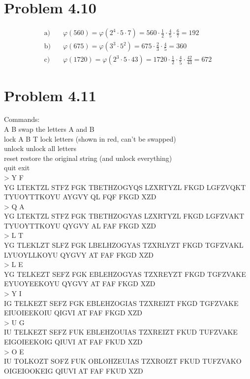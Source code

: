 \documentclass[12pt]{article}
\begin{document}
\section*{Problem 4.10}
    \begin{align*}
    \text{a)} & \quad \varphi(560) = \varphi(2^4 \cdot 5 \cdot 7) = 560 \cdot \frac{1}{2} \cdot \frac{4}{5} \cdot \frac{6}{7} = 192 \\
    \text{b)} & \quad \varphi(675) = \varphi(3^3 \cdot 5^2) = 675 \cdot \frac{2}{3} \cdot \frac{4}{5} = 360 \\
    \text{c)} & \quad \varphi(1720) = \varphi(2^3 \cdot 5 \cdot 43) = 1720 \cdot \frac{1}{2} \cdot \frac{4}{5} \cdot \frac{42}{43} = 672
\end{align*}
\section*{Problem 4.11}
Commands:\\
  A B        swap the letters A and B\\
  lock A B T lock letters (shown in red, can't be swapped)\\
  unlock     unlock all letters\\
  reset      restore the original string (and unlock everything)\\
  quit       exit\\
> Y F\\
YG LTEKTZL STFZ FGK TBETHZOGYQS LZXRTYZL FKGD LGFZVQKT TYUOYTTKOYU AYGVY QL FQF FKGD XZD\\
> Q A\\
YG LTEKTZL STFZ FGK TBETHZOGYAS LZXRTYZL FKGD LGFZVAKT TYUOYTTKOYU QYGVY AL FAF FKGD XZD\\
> L T\\
YG TLEKLZT SLFZ FGK LBELHZOGYAS TZXRLYZT FKGD TGFZVAKL LYUOYLLKOYU QYGVY AT FAF FKGD XZD\\
> L E\\
YG TELKEZT SEFZ FGK EBLEHZOGYAS TZXREYZT FKGD TGFZVAKE EYUOYEEKOYU QYGVY AT FAF FKGD XZD\\
> Y I\\
IG TELKEZT SEFZ FGK EBLEHZOGIAS TZXREIZT FKGD TGFZVAKE EIUOIEEKOIU QIGVI AT FAF FKGD XZD\\
> U G\\
IU TELKEZT SEFZ FUK EBLEHZOUIAS TZXREIZT FKUD TUFZVAKE EIGOIEEKOIG QIUVI AT FAF FKUD XZD\\
> O E\\
IU TOLKOZT SOFZ FUK OBLOHZEUIAS TZXROIZT FKUD TUFZVAKO OIGEIOOKEIG QIUVI AT FAF FKUD XZD\\
\end{document}
